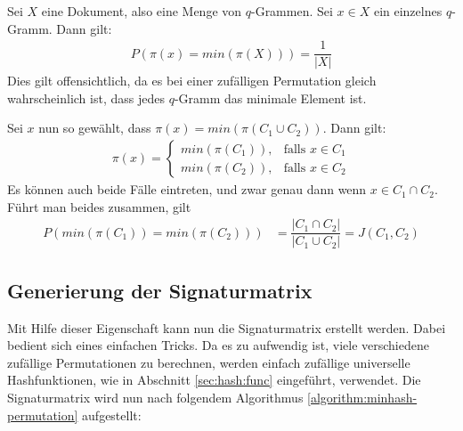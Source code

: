 \begin{beweis}
Sei $X$ eine Dokument, also eine Menge von $q$-Grammen.
Sei $x \in X$ ein einzelnes $q$-Gramm.
Dann gilt:
\begin{align*}
	P(\pi(x) = min(\pi(X))) = \dfrac{1}{\vert X \vert}
\end{align*}
Dies gilt offensichtlich, da es bei einer zufälligen Permutation gleich wahrscheinlich ist, dass jedes $q$-Gramm das minimale Element ist.


Sei $x$ nun so gewählt, dass $\pi(x) = min(\pi (C_1 \cup C_2))$.
Dann gilt:
\begin{align*}
	\pi(x) =\begin{cases}
		min(\pi(C_1)), & \text{falls } x \in C_1 \\
		min(\pi(C_2)), & \text{falls } x \in C_2
	\end{cases}
\end{align*}
Es können auch beide Fälle eintreten, und zwar genau dann wenn $x \in C_1 \cap C_2$.
Führt man beides zusammen, gilt
\begin{align*}
	P(min(\pi (C_1)) = min (\pi (C_2))) &= \dfrac{\vert C_1 \cap C_2 \vert}{\vert C_1 \cup C_2 \vert} = J(C_1, C_2)
\end{align*}
\end{beweis}

\subsection{Generierung der Signaturmatrix}
\label{sec:lsh:min:sig}
Mit Hilfe dieser Eigenschaft kann nun die Signaturmatrix erstellt werden.
Dabei bedient sich \citet{Leskovec2014a} eines einfachen Tricks.
Da es zu aufwendig ist, viele verschiedene zufällige Permutationen zu berechnen, werden einfach zufällige universelle Hashfunktionen, wie in Abschnitt \ref{sec:hash:func} eingeführt, verwendet.
Die Signaturmatrix wird nun nach folgendem Algorithmus \ref{algorithm:minhash-permutation} aufgestellt:


